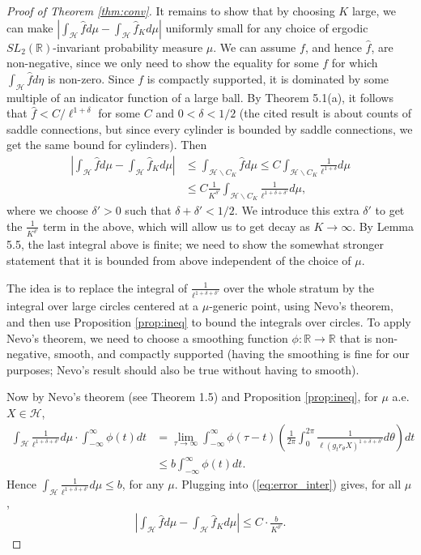 \documentclass{article}
\theoremstyle{definition}
\begin{document}
\begin{proof}[Proof of Theorem \ref{thm:conv}]
It remains to show that by choosing $K$ large, we can make $\left|\int_{\mathcal{H}} \hat f d\mu - \int_{\mathcal{H}} \hat f_K d\mu\right|$ uniformly small for any choice of ergodic $SL_2(\mathbb{R})$-invariant probability measure $\mu$.  We can assume $f$, and hence $\hat f$, are non-negative, since we only need to show the equality for some $f$ for which $\int_{\mathcal{H}} \hat f d\eta$ is non-zero.  Since $f$ is compactly supported, it is dominated by some multiple of an indicator function of a large ball.  By \cite{em2001} Theorem 5.1(a), it follows that $\hat f < C/\ell^{1+\delta}$ for some $C$ and $0< \delta<1/2$ (the cited result is about counts of saddle connections, but since every cylinder is bounded by saddle connections, we get the same bound for cylinders).  Then
\begin{align}
\left|\int_{\mathcal{H}} \hat f d\mu - \int_{\mathcal{H}} \hat f_K d\mu\right| &\le \int_{\mathcal{H}\backslash C_K} \hat f d\mu \le C \int_{\mathcal{H}\backslash C_K} \frac{1}{\ell^{1+\delta}} d\mu \\
&\le C \frac{1}{K^{\delta'}} \int _{\mathcal{H}\backslash C_K} \frac{1}{\ell^{1+\delta+\delta'}} d\mu, \label{eq:error_inter}
\end{align}
where we choose $\delta'>0$ such that $\delta+\delta'<1/2$.  We introduce this extra $\delta'$ to get the $\frac{1}{K^{\delta'}}$ term in the above, which will allow us to get decay as $K\to \infty$.  By \cite{em2001} Lemma 5.5, the last integral above is finite; we need to show the somewhat stronger statement that it is bounded from above independent of the choice of $\mu$.  

The idea is to replace the integral of $\frac{1}{\ell^{1+\delta+\delta'}}$ over the whole stratum by the integral over large circles centered at a $\mu$-generic point, using Nevo's theorem, and then use Proposition \ref{prop:ineq} to bound the integrals over circles.  To apply Nevo's theorem, we need to choose a smoothing function $\phi : \mathbb{R} \to \mathbb{R}$ that is non-negative, smooth, and compactly supported (having the smoothing is fine for our purposes; Nevo's result should also be true without having to smooth).  

Now by Nevo's theorem (see \cite{em2001} Theorem 1.5) and Proposition \ref{prop:ineq}, for $\mu$ a.e. $X\in \mathcal{H}$,
\begin{align*}
\int_{\mathcal{H}} \frac{1}{\ell^{1+\delta+\delta'}} d\mu \cdot \int_{-\infty}^{\infty} \phi(t)dt &= \lim_{\tau\to\infty}\int_{-\infty}^{\infty} \phi(\tau-t) \left( \frac{1}{2\pi} \int_0^{2\pi} \frac{1}{\ell(g_t r_{\theta}X)^{1+\delta+\delta'}} d\theta  \right) dt \\
& \le b \int_{-\infty}^{\infty} \phi(t)dt. 
\end{align*}
Hence $\int_{\mathcal{H}} \frac{1}{\ell^{1+\delta+\delta'}} d\mu \le b$, for any $\mu$.  Plugging into (\ref{eq:error_inter}) gives, for all $\mu$,
\begin{align}
  \label{eq:error}
  \left|\int_{\mathcal{H}} \hat f d\mu - \int_{\mathcal{H}} \hat f_K d\mu\right|  \le C\cdot \frac{b}{K^{\delta'}}. 
\end{align}



\end{proof}
\end{document}
